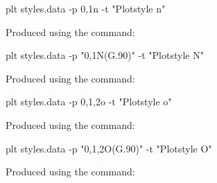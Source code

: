 \documentclass{book}
\begin{document}
\begin{figure}
\begin{center}
\end{center}
\caption[Plotstyle n]{Produced using the command:
\label{fig:style-n}}
\begin{center}
\begin{boxedverbatim}
plt styles.data -p 0,1n -t "Plotstyle n"
\end{boxedverbatim}
\end{center}
\end{figure}

\begin{figure}
\begin{center}
\end{center}
\caption[Plotstyle N]{Produced using the command:
\label{fig:style-N}}
\begin{center}
\begin{boxedverbatim}
plt styles.data -p "0,1N(G.90)" -t "Plotstyle N"
\end{boxedverbatim}
\end{center}
\end{figure}

\begin{figure}
\begin{center}
\end{center}
\caption[Plotstyle o]{Produced using the command:
\label{fig:style-o}}
\begin{center}
\begin{boxedverbatim}
plt styles.data -p 0,1,2o -t "Plotstyle o"
\end{boxedverbatim}
\end{center}
\end{figure}

\begin{figure}
\begin{center}
\end{center}
\caption[Plotstyle O]{Produced using the command:
\label{fig:style-O}}
\begin{center}
\begin{boxedverbatim}
plt styles.data -p "0,1,2O(G.90)" -t "Plotstyle O"
\end{boxedverbatim}
\end{center}
\end{figure}
\end{document}
